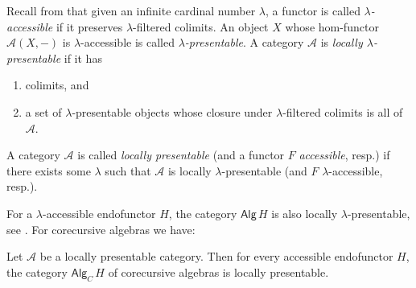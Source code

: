 \documentclass{LMCS}
\theoremstyle{plain}
\theoremstyle{definition}
\numberwithin{equation}{section}
\begin{document}
Recall from \cite{GU} that given an infinite cardinal number $\lambda$, a functor is called {\it $\lambda$-accessible} if it preserves $\lambda$-filtered colimits. An object $X$ whose hom-functor $\mathcal A(X,-)$ is $\lambda$-accessible is called {\it $\lambda$-presentable}. A category $\mathcal A$ is {\it locally $\lambda$-presentable} if it has
\begin{enumerate}[label=\({\alph*}]
\item colimits, and
\item a set of $\lambda$-presentable objects whose closure under $\lambda$-filtered colimits is all of $\mathcal A$. 
\end{enumerate}
A category $\mathcal A$ is called \emph{locally presentable} (and a functor $F$ \emph{accessible}, resp.) if there exists some $\lambda$ such that $\mathcal A$ is locally $\lambda$-presentable (and $F$ $\lambda$-accessible, resp.). 

For a $\lambda$-accessible endofunctor $H$, the category $\mathsf{Alg}\, H$ is also locally $\lambda$-presentable, see \cite{ar}. For corecursive algebras we have:


\begin{prop}\label{dirlim of cor is cor}
Let $\mathcal A$ be a locally presentable category. Then for every accessible endo\-functor $H$, the category $\mathsf{Alg}_C\, H$ of corecursive algebras is locally presentable.
\end{prop}
\end{document}
